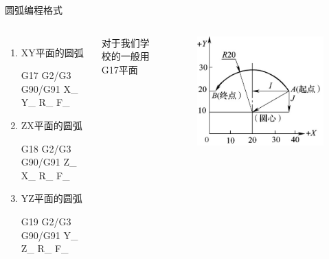 \documentclass[UTF8,zihao=-4,handout,smaller,aspectratio=1610]{ctexbeamer}
\begin{document}
\begin{frame}{圆弧编程格式}
    \begin{columns}

 \begin{enumerate}
     \item XY平面的圆弧 
   
 G17  G2/G3  G90/G91 X\_ Y\_ R\_ F\_
 
 \item ZX平面的圆弧 
   
 G18 G2/G3 G90/G91 Z\_ X\_ R\_ F\_
 
\item  YZ平面的圆弧   
 
 G19 G2/G3 G90/G91 Y\_ Z\_ R\_ F\_
 
 \end{enumerate}
  对于我们学校的一般用G17平面
        \begin{figure}
            \centering
            \includegraphics[width=1\linewidth]{image/4-3}
            \caption{}
            \label{fig:4-3}
        \end{figure}
        
        
    \end{columns}
\end{frame}
\end{document}
